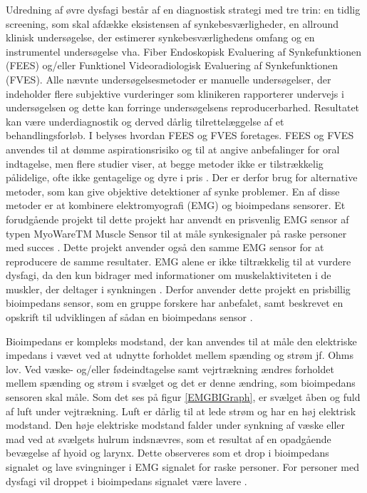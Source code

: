 Udredning af øvre dysfagi består af en diagnostisk strategi med tre trin: en tidlig screening, som skal afdække eksistensen af synkebesværligheder, en allround klinisk undersøgelse, der estimerer synkebesværlighedens omfang og en instrumentel undersøgelse vha. Fiber Endoskopisk Evaluering af Synkefunktionen (FEES) og/eller Funktionel Videoradiologisk Evaluering af Synkefunktionen (FVES). Alle nævnte undersøgelsesmetoder er manuelle undersøgelser, der indeholder flere subjektive vurderinger som klinikeren rapporterer undervejs i undersøgelsen og dette kan forringe undersøgelsens reproducerbarhed. Resultatet kan være underdiagnostik og derved dårlig tilrettelæggelse af et behandlingsforløb. I  belyses hvordan FEES og FVES foretages. FEES og FVES anvendes til at dømme aspirationsrisiko og til at angive anbefalinger for oral indtagelse, men flere studier viser, at begge metoder ikke er tilstrækkelig pålidelige,  ofte ikke gentagelige og dyre i pris \cite{Kelly2006} \cite{McCullough2001Inter-Measures} \cite{Schultheiss2014} \cite{Nahrstaedt2012SwallowMeasurements}.  Der er derfor brug for alternative metoder, som kan give objektive detektioner af synke problemer. En af disse metoder er at kombinere elektromyografi (EMG) og bioimpedans sensorer. Et forudgående projekt til dette projekt har anvendt en prisvenlig EMG sensor af typen MyoWareTM Muscle Sensor til at måle synkesignaler på raske personer med succes \cite[s. 58]{ChristensenElisabethLundbakStrand2017}. Dette projekt anvender også den samme EMG sensor for at reproducere de samme resultater. EMG alene er ikke tiltrækkelig til at vurdere dysfagi, da den kun bidrager med informationer om muskelaktiviteten i de muskler, der deltager i synkningen \cite{Schultheiss2014}. Derfor anvender dette projekt en prisbillig bioimpedans sensor, som en gruppe forskere har anbefalet, samt beskrevet en opskrift til udviklingen af sådan en bioimpedans sensor \cite{Aroom2009}.

Bioimpedans er kompleks modstand, der kan anvendes til at måle den elektriske impedans i vævet ved at udnytte forholdet mellem spænding og strøm jf. Ohms lov. Ved væske- og/eller fødeindtagelse samt vejrtrækning ændres forholdet mellem spænding og strøm i svælget og det er denne ændring, som bioimpedans sensoren skal måle. Som det ses på figur \ref{EMGBIGraph}, er svælget åben og fuld af luft under vejtrækning. Luft er dårlig til at lede strøm og har en høj elektrisk modstand. Den høje elektriske modstand falder under synkning af væske eller mad ved at svælgets hulrum indsnævres, som et resultat af en opadgående bevægelse af hyoid og larynx. Dette observeres som et drop i bioimpedans signalet og lave svingninger i EMG signalet for raske personer. For personer med dysfagi vil droppet i bioimpedans signalet være lavere  \cite{Schultheiss2014}.  



